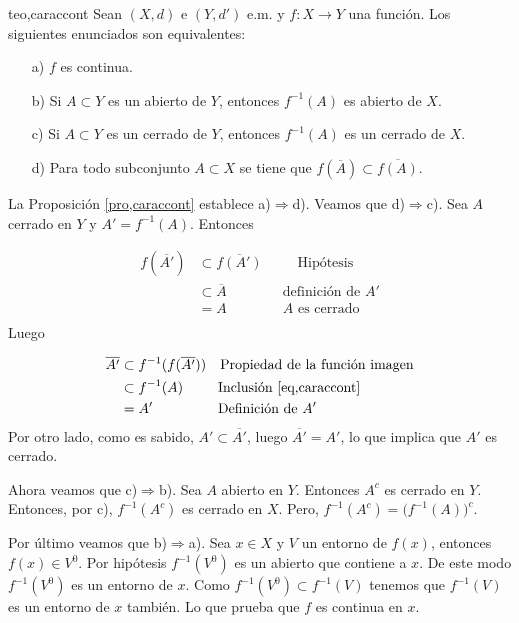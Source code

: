 \begin{teorema}{teo,caraccont} Sean $(X,d)$ e $(Y,d')$ e.m. y $f:X\rightarrow Y$
una función. Los siguientes enunciados son equivalentes:
\begin{itemize}
\item[a)] $f$ es continua.
\item[b)]  Si $A\subset Y$ es un abierto de $Y$, entonces $f^{-1}(A)$ es
abierto de $X$.
\item[c)] Si $A\subset Y$ es un cerrado de $Y$, entonces $f^{-1}(A)$ es
un cerrado de $X$.
\item[d)] Para todo subconjunto $A\subset X$ se tiene que
$f(\overline{A})\subset \overline{f(A)}$.
\end{itemize}
\end{teorema}
\begin{demo} La Proposición \vref{pro,caraccont} establece
a)$\Rightarrow$d). Veamos que d)$\Rightarrow$c). Sea $A$ cerrado
en $Y$ y $A'=f^{-1}(A)$. Entonces

\begin{equation}\label{eq,caraccont}
  \begin{split}
       f(\overline{A'})&\subset\overline{f(A')}\quad\quad\,\,\,\text{Hipótesis}\\
       &\subset\overline{A}\quad\quad\quad\quad\text{definición de $A'$}\\
        &=A\quad\quad\quad\quad\text{$A$ es cerrado}\\
  \end{split}
\end{equation}
Luego

\[
    \begin{split}
        \overline{A'}&\subset f^{-1}(f(\overline{A'}))\quad\text{Propiedad de la
        función imagen}\\
        &\subset f^{-1}(A)\,\,\,\quad\quad\text{Inclusión
        \ref{eq,caraccont}}\\
        &=A'\quad\quad\quad\quad\,\,\,\,\text{Definición de $A'$}
    \end{split}
\]
Por otro lado, como es sabido, $A'\subset \overline{A'}$, luego
$\overline{A'}=A'$, lo que implica que $A'$ es cerrado.

Ahora veamos que c)$\Rightarrow$b). Sea $A$ abierto en $Y$.
Entonces $A^c$ es cerrado en $Y$. Entonces, por c), $f^{-1}(A^c)$
es cerrado en $X$. Pero, $f^{-1}(A^c)=\bigl(f^{-1}(A)\bigr)^c$.

Por último veamos que b)$\Rightarrow$a). Sea $x\in X$ y $V$ un
entorno de $f(x)$, entonces $f(x)\in V^0$. Por hipótesis
$f^{-1}(V^0)$ es un abierto que contiene a $x$. De este modo
$f^{-1}(V^0)$ es un entorno de $x$. Como $f^{-1}(V^0)\subset
f^{-1}(V)$ tenemos que $f^{-1}(V)$ es un entorno de $x$ también.
Lo que prueba que $f$ es continua en $x$.
\end{demo}

